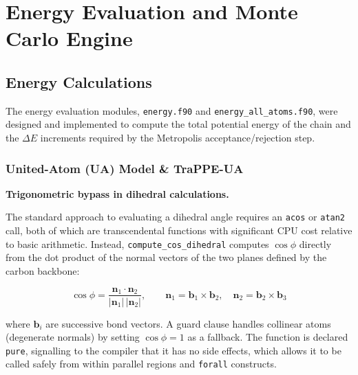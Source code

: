 

\section{Energy Evaluation and Monte Carlo Engine}
\label{sec:energy_mc}

\subsection{Energy Calculations}

The energy evaluation modules, \texttt{energy.f90} and \texttt{energy\_all\_atoms.f90}, were designed and implemented to compute the total potential energy of the chain and the $\Delta E$ increments required by the Metropolis acceptance/rejection step.

\subsubsection{United-Atom (UA) Model \& TraPPE-UA}

\textbf{Trigonometric bypass in dihedral calculations.}

The standard approach to evaluating a dihedral angle requires an
\texttt{acos} or \texttt{atan2} call, both of which are transcendental
functions with significant CPU cost relative to basic arithmetic.
Instead, \texttt{compute\_cos\_dihedral} computes $\cos\phi$ directly
from the dot product of the normal vectors of the two planes defined by
the carbon backbone:

\begin{equation}
  \cos\phi = \frac{\mathbf{n}_1 \cdot \mathbf{n}_2}{|\mathbf{n}_1|\,|\mathbf{n}_2|},
  \qquad
  \mathbf{n}_1 = \mathbf{b}_1 \times \mathbf{b}_2,\quad
  \mathbf{n}_2 = \mathbf{b}_2 \times \mathbf{b}_3
\end{equation}

where $\mathbf{b}_i$ are successive bond vectors. A guard clause handles
collinear atoms (degenerate normals) by setting $\cos\phi = 1$ as a
fallback. The function is declared \texttt{pure}, signalling to the compiler
that it has no side effects, which allows it to be called safely
from within parallel regions and \texttt{forall} constructs.

